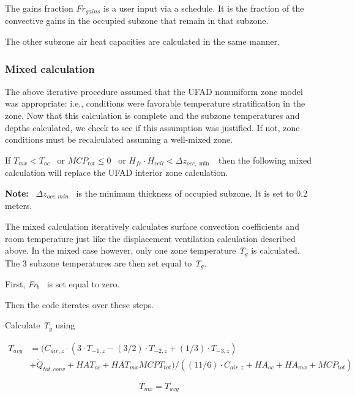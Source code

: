 The gains fraction \(F{r_{gains}}\) is a user input via a schedule. It is the fraction of the convective gains in the occupied subzone that remain in that subzone.

The other subzone air heat capacities are calculated in the same manner.

\subsubsection{Mixed calculation}\label{mixed-calculation-1}

The above iterative procedure assumed that the UFAD nonuniform zone model was appropriate: i.e., conditions were favorable temperature stratification in the zone. Now that this calculation is complete and the subzone temperatures and depths calculated, we check to see if this assumption was justified. If not, zone conditions must be recalculated assuming a well-mixed zone.

If \({T_{mx}} < {T_{oc}}\) ~or \(MC{P_{tot}} \le 0\) ~or \({H_{fr}} \cdot {H_{ceil}} < \Delta {z_{occ,\min }}\) ~then the following mixed calculation will replace the UFAD interior zone calculation.

\textbf{Note:} ~\(\Delta {z_{occ,min}}\) ~is the minimum thickness of occupied subzone. It is set to 0.2 meters.

The mixed calculation iteratively calculates surface convection coefficients and room temperature just like the displacement ventilation calculation described above. In the mixed case however, only one zone temperature \emph{T\(_{g}\)} is calculated. The 3 subzone temperatures are then set equal to \emph{T\(_{g}\)}.

First, \emph{Fr\(_{b}\)}~ is set equal to zero.

Then the code iterates over these steps.

Calculate \emph{T\(_{g}\)} using

\begin{equation}
  \begin{array}{rl}
    T_{avg} &= ({C_{air,z}} \cdot (3 \cdot {T_{ - 1,z}} - (3/2) \cdot {T_{ - 2,z}} + (1/3) \cdot {T_{ - 3,z}}) \\
            &+ {{\dot Q}_{tot,conv}} + HA{T_{oc}} + HA{T_{mx}}MCP{T_{tot}})/((11/6) \cdot {C_{air,z}} + H{A_{oc}} + H{A_{mx}} + MC{P_{tot}})
  \end{array}
\end{equation}

\begin{equation}
{T_{mx}} = {T_{avg}}
\end{equation}

